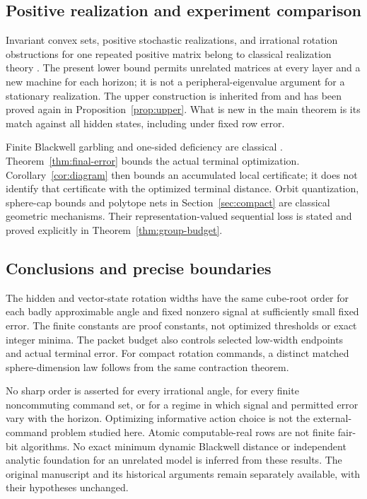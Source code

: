 \subsection{Positive realization and experiment comparison}
Invariant convex sets, positive stochastic realizations, and irrational
rotation obstructions for one repeated positive matrix belong to
classical realization theory \cite{Heller,Vidyasagar,BF,MW}.
The present lower bound permits unrelated matrices at every layer and a
new machine for each horizon; it is not a peripheral-eigenvalue argument
for a stationary realization. The upper construction is inherited from
\cite{GTF33,GTF34} and has been proved again in
Proposition~\ref{prop:upper}. What is new in the main theorem is its
match against all hidden states, including under fixed row error.

Finite Blackwell garbling and one-sided deficiency are classical
\cite{Blackwell,Torgersen}. Theorem~\ref{thm:final-error} bounds the
actual terminal optimization. Corollary~\ref{cor:diagram} then bounds
an accumulated local certificate; it does not identify that certificate
with the optimized terminal distance. Orbit quantization, sphere-cap
bounds and polytope nets in Section~\ref{sec:compact} are classical
geometric mechanisms. Their representation-valued sequential loss is
stated and proved explicitly in Theorem~\ref{thm:group-budget}.

\subsection{Conclusions and precise boundaries}
The hidden and vector-state rotation widths have the same cube-root
order for each badly approximable angle and fixed nonzero signal at
sufficiently small fixed error. The finite constants are proof constants,
not optimized thresholds or exact integer minima. The packet budget
also controls selected low-width endpoints and actual terminal error.
For compact rotation commands, a distinct matched sphere-dimension law
follows from the same contraction theorem.

No sharp order is asserted for every irrational angle, for every finite
noncommuting command set, or for a regime in which signal and permitted
error vary with the horizon. Optimizing informative action choice is
not the external-command problem studied here. Atomic computable-real
rows are not finite fair-bit algorithms. No exact minimum dynamic
Blackwell distance or independent analytic foundation for an unrelated
model is inferred from these results. The original manuscript and its
historical arguments remain separately available, with their hypotheses
unchanged.
